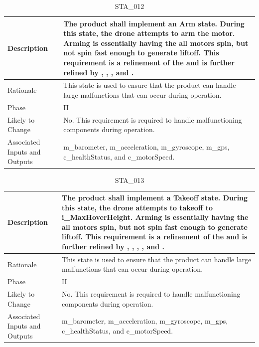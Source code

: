 \documentclass{article}
\begin{document}
\begin{table}[!h]
\begin{center}
\caption {STA\_012} 
\label{STA_012}
\begin{tabular}{ | m{3cm} | m{11cm} | }
\hline
Description & The product shall implement an Arm state. During this state, the drone attempts to arm the motor. Arming is essentially having the all motors spin, but not spin fast enough to generate liftoff. This requirement is a refinement of the \nameref{Arm State} and is further refined by \nameref{PERF_007}, \nameref{SAFE_001}, \nameref{SAFE_003}, and \nameref{USE_003}. \\
\hline
Rationale & This state is used to ensure that the product can handle large malfunctions that can occur during operation. \\
\hline
Phase & II \\
\hline
Likely to Change & No. This requirement is required to handle malfunctioning components during operation. \\
\hline
Associated Inputs and Outputs & m\_barometer, m\_acceleration, m\_gyroscope, m\_gps, c\_healthStatus, and c\_motorSpeed. \\
\hline
\end{tabular}
\end{center}
\end{table}

\begin{table}[!h]
\begin{center}
\caption {STA\_013} 
\label{STA_013}
\begin{tabular}{ | m{3cm} | m{11cm} | }
\hline
Description & The product shall implement a Takeoff state. During this state, the drone attempts to takeoff to i\_MaxHoverHeight. Arming is essentially having the all motors spin, but not spin fast enough to generate liftoff. This requirement is a refinement of the \nameref{Takeoff State} and is further refined by \nameref{PERF_002}, \nameref{PERF_007}, \nameref{SAFE_001}, \nameref{SAFE_003}, and \nameref{USE_003}. \\
\hline
Rationale & This state is used to ensure that the product can handle large malfunctions that can occur during operation. \\
\hline
Phase & II \\
\hline
Likely to Change & No. This requirement is required to handle malfunctioning components during operation. \\
\hline
Associated Inputs and Outputs & m\_barometer, m\_acceleration, m\_gyroscope, m\_gps, c\_healthStatus, and c\_motorSpeed. \\
\hline
\end{tabular}
\end{center}
\end{table}
\end{document}
